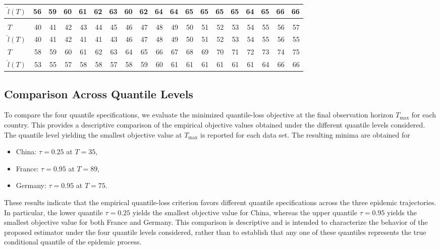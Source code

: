 \documentclass[12pt,a4paper]{article}
\begin{document}
{\begin{landscape}
\begin{table}[htbp]
\begin{tabular*}{\linewidth}{@{\extracolsep{\fill}}lrrrrrrrrrrrrrrrrrr}
					$\hat{l}(T)$ & 56 & 59 & 60 & 61 & 62 & 63 & 60 & 62 & 64 & 64 & 65 & 65 & 65 & 65 & 64 & 65 & 66 & 66 \\
					\midrule\addlinespace[2.5pt]
					\multicolumn{19}{c}{\textbf{$\tau=0.95,\ T_{\mathrm{entry}}=51,\ \varepsilon=15$}} \\
					\addlinespace[2.5pt]
					\midrule
					$T$ & 40 & 41 & 42 & 43 & 44 & 45 & 46 & 47 & 48 & 49 & 50 & 51 & 52 & 53 & 54 & 55 & 56 & 57 \\
					$\hat{l}(T)$ & 40 & 41 & 42 & 41 & 41 & 43 & 46 & 47 & 48 & 49 & 50 & 51 & 52 & 53 & 54 & 55 & 56 & 55 \\
					$T$ & 58 & 59 & 60 & 61 & 62 & 63 & 64 & 65 & 66 & 67 & 68 & 69 & 70 & 71 & 72 & 73 & 74 & 75 \\
					$\hat{l}(T)$ & 53 & 55 & 57 & 58 & 58 & 57 & 58 & 59 & 60 & 61 & 61 & 61 & 61 & 61 & 61 & 64 & 66 & 66 \\
					\bottomrule
				\end{tabular*}
			\end{table}
		\end{landscape}
		
		\subsection{Comparison Across Quantile Levels}
		
		To compare the four quantile specifications, we evaluate the minimized quantile-loss objective at the final observation horizon $T_{\max}$ for each country. This provides a descriptive comparison of the empirical objective values obtained under the different quantile levels considered. The quantile level yielding the smallest objective value at $T_{\max}$ is reported for each data set.
		The resulting minima are obtained for
		\begin{itemize}
			\item China: $\tau=0.25$ at $T=35$,
			\item France: $\tau=0.95$ at $T=89$,
			\item Germany: $\tau=0.95$ at $T=75$.
		\end{itemize}
		These results indicate that the empirical quantile-loss criterion favors different quantile specifications across the three epidemic trajectories. In particular, the lower quantile $\tau=0.25$ yields the smallest objective value for China, whereas the upper quantile $\tau=0.95$ yields the smallest objective value for both France and Germany. This comparison is descriptive and is intended to characterize the behavior of the proposed estimator under the four quantile levels considered, rather than to establish that any one of these quantiles represents the true conditional quantile of the epidemic process.
	}
	
\end{document}
